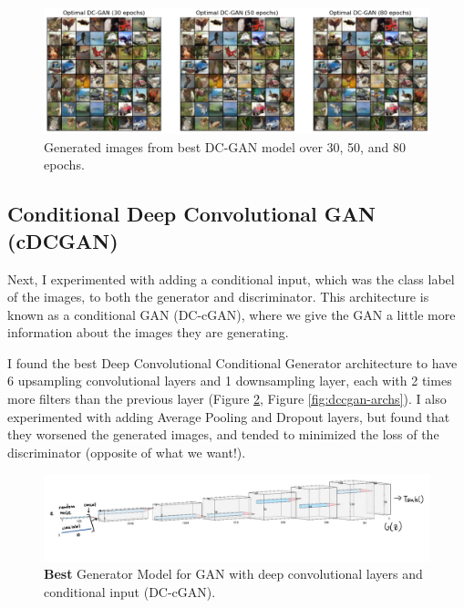 \documentclass[twoside,11pt]{article}
\begin{document}
\begin{figure}[h!]
  \centering
  \includegraphics[width=18cm]{images/dcgan-experiments/dcgan-outputs.png}
  \caption{Generated images from best DC-GAN model over 30, 50, and 80 epochs.}
  \label{fig:dcgan-outputs}
\end{figure}

\subsection{Conditional Deep Convolutional GAN (cDCGAN)}

Next, I experimented with adding a conditional input, which was the class label of the images, to both the generator and discriminator. This architecture is known as a conditional GAN (DC-cGAN), where we give the GAN a little more information about the images they are generating.

I found the best Deep Convolutional Conditional Generator architecture to have 6 upsampling convolutional layers and 1 downsampling layer, each with 2 times more filters than the previous layer (Figure \ref{fig:best-dccgan}, Figure \ref{fig:dccgan-archs}). I also experimented with adding Average Pooling and Dropout layers, but found that they worsened the generated images, and tended to minimized the loss of the discriminator (opposite of what we want!).

\begin{figure}[h!]
  \centering
  \includegraphics[width=18cm]{images/dccgan-experiments/dccgan8.jpeg}
  \caption{\textbf{Best} Generator Model for GAN with deep convolutional layers and conditional input (DC-cGAN).}
  \label{fig:best-dccgan}
\end{figure}
\end{document}
